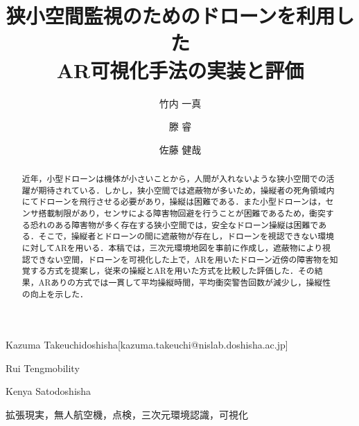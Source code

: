 \documentclass[submit,techrep]{ipsj}
\begin{document}
\title{狭小空間監視のためのドローンを利用した\\ AR可視化手法の実装と評価}





\author{竹内 一真}{Kazuma Takeuchi}{doshisha}[kazuma.takeuchi@nislab.doshisha.ac.jp]
\author{滕 睿}{Rui Teng}{mobility}
\author{佐藤 健哉}{Kenya Sato}{doshisha}



\begin{abstract}

近年，小型ドローンは機体が小さいことから，人間が入れないような狭小空間での活躍が期待されている．しかし，狭小空間では遮蔽物が多いため，操縦者の死角領域内にてドローンを飛行させる必要があり，操縦は困難である．また小型ドローンは，センサ搭載制限があり，センサによる障害物回避を行うことが困難であるため，衝突する恐れのある障害物が多く存在する狭小空間では，安全なドローン操縦は困難である．そこで，操縦者とドローンの間に遮蔽物が存在し，ドローンを視認できない環境に対してARを用いる．本稿では，三次元環境地図を事前に作成し，遮蔽物により視認できない空間，ドローンを可視化した上で，ARを用いたドローン近傍の障害物を知覚する方式を提案し，従来の操縦とARを用いた方式を比較した評価した．その結果，ARありの方式では一貫して平均操縦時間，平均衝突警告回数が減少し，操縦性の向上を示した．

\end{abstract}

\begin{jkeyword}
拡張現実，無人航空機，点検，三次元環境認識，可視化
\end{jkeyword}
\end{document}
